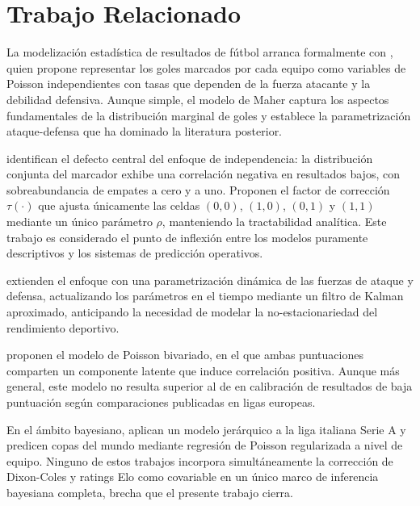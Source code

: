 \documentclass[12pt,a4paper]{article}
\begin{document}
\section{Trabajo Relacionado}
\label{sec:related}

La modelización estadística de resultados de fútbol arranca formalmente con
\citet{maher1982modelling}, quien propone representar los goles marcados por
cada equipo como variables de Poisson independientes con tasas que dependen de
la fuerza atacante y la debilidad defensiva.
Aunque simple, el modelo de Maher captura los aspectos fundamentales de la
distribución marginal de goles y establece la parametrización ataque-defensa
que ha dominado la literatura posterior.

\citet{dixon1997modelling} identifican el defecto central del enfoque de
independencia: la distribución conjunta del marcador exhibe una correlación
negativa en resultados bajos, con sobreabundancia de empates a cero y a uno.
Proponen el factor de corrección $\tau(\cdot)$ que ajusta únicamente las celdas
$(0,0)$, $(1,0)$, $(0,1)$ y $(1,1)$ mediante un único parámetro $\rho$,
manteniendo la tractabilidad analítica.
Este trabajo es considerado el punto de inflexión entre los modelos puramente
descriptivos y los sistemas de predicción operativos.

\citet{rue2000prediction} extienden el enfoque con una parametrización dinámica
de las fuerzas de ataque y defensa, actualizando los parámetros en el tiempo
mediante un filtro de Kalman aproximado, anticipando la necesidad de modelar
la no-estacionariedad del rendimiento deportivo.

\citet{karlis2003analysis} proponen el modelo de Poisson bivariado, en el que
ambas puntuaciones comparten un componente latente que induce correlación positiva.
Aunque más general, este modelo no resulta superior al de \citet{dixon1997modelling}
en calibración de resultados de baja puntuación según comparaciones publicadas
en ligas europeas.

En el ámbito bayesiano, \citet{baio2010bayesian} aplican un modelo jerárquico
a la liga italiana Serie A y \citet{groll2018prediction} predicen copas del mundo
mediante regresión de Poisson regularizada a nivel de equipo.
Ninguno de estos trabajos incorpora simultáneamente la corrección de Dixon-Coles
y ratings Elo como covariable en un único marco de inferencia bayesiana completa,
brecha que el presente trabajo cierra.
\end{document}
